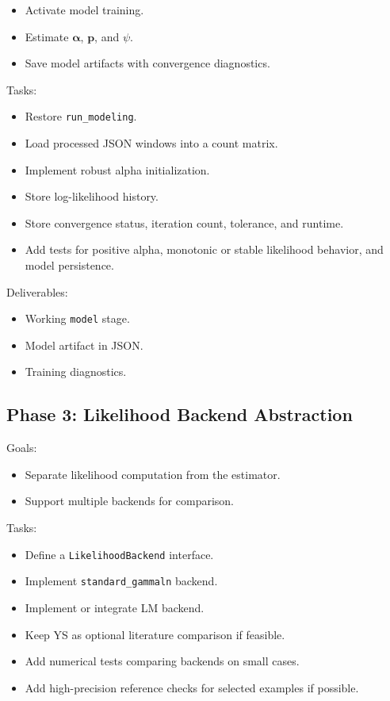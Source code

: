 \documentclass[11pt,a4paper]{article}
\begin{document}
\begin{itemize}
  \item Activate model training.
  \item Estimate \(\boldsymbol{\alpha}\), \(\mathbf{p}\), and \(\psi\).
  \item Save model artifacts with convergence diagnostics.
\end{itemize}

Tasks:

\begin{itemize}
  \item Restore \texttt{run\_modeling}.
  \item Load processed JSON windows into a count matrix.
  \item Implement robust alpha initialization.
  \item Store log-likelihood history.
  \item Store convergence status, iteration count, tolerance, and runtime.
  \item Add tests for positive alpha, monotonic or stable likelihood behavior, and model persistence.
\end{itemize}

Deliverables:

\begin{itemize}
  \item Working \texttt{model} stage.
  \item Model artifact in JSON.
  \item Training diagnostics.
\end{itemize}

\subsection{Phase 3: Likelihood Backend Abstraction}

Goals:

\begin{itemize}
  \item Separate likelihood computation from the estimator.
  \item Support multiple backends for comparison.
\end{itemize}

Tasks:

\begin{itemize}
  \item Define a \texttt{LikelihoodBackend} interface.
  \item Implement \texttt{standard\_gammaln} backend.
  \item Implement or integrate LM backend.
  \item Keep YS as optional literature comparison if feasible.
  \item Add numerical tests comparing backends on small cases.
  \item Add high-precision reference checks for selected examples if possible.
\end{itemize}
\end{document}
